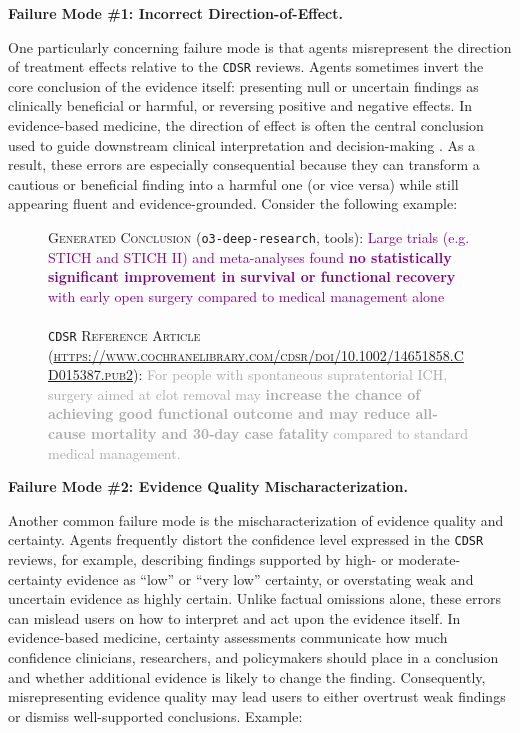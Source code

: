 \documentclass{article}
\newcommand{\xhdr}[1]{%
  \noindent\textbf{#1.}
}
\begin{document}
\xhdr{Failure Mode \#1: Incorrect Direction-of-Effect} 
One particularly concerning failure mode is that agents misrepresent the direction of treatment effects relative to the \texttt{CDSR} reviews. Agents sometimes invert the core conclusion of the evidence itself: presenting null or uncertain findings as clinically beneficial or harmful, or reversing positive and negative effects. In evidence-based medicine, the direction of effect is often the central conclusion used to guide downstream clinical interpretation and decision-making \cite{oxman2022key}. As a result, these errors are especially consequential because they can transform a cautious or beneficial finding into a harmful one (or vice versa) while still appearing fluent and evidence-grounded. Consider the following example:

\begin{figure}[h!]
\centering
\begin{small}
\begin{tcolorbox}[colback=gray!5, colframe=red, width=\textwidth]
\textsc{Generated Conclusion} (\texttt{o3-deep-research}, tools): \textcolor{purple}{Large trials (e.g. STICH and STICH II) and meta-analyses found \textbf{no statistically significant improvement in survival or functional recovery} with early open surgery compared to medical management alone}\\\\
\texttt{CDSR} \textsc{Reference Article (\url{https://www.cochranelibrary.com/cdsr/doi/10.1002/14651858.CD015387.pub2}):} \textcolor{darkgray}{For people with spontaneous supratentorial ICH, surgery aimed at clot removal may \textbf{increase the chance of achieving good functional outcome and may reduce all‐cause mortality and 30‐day case fatality} compared to standard medical management.} 
\end{tcolorbox}
\end{small}
\end{figure}

\xhdr{Failure Mode \#2: Evidence Quality Mischaracterization}
Another common failure mode is the mischaracterization of evidence quality and certainty. Agents frequently distort the confidence level expressed in the \texttt{CDSR} reviews, for example, describing findings supported by high- or moderate-certainty evidence as ``low'' or ``very low'' certainty, or overstating weak and uncertain evidence as highly certain. Unlike factual omissions alone, these errors can mislead users on how to interpret and act upon the evidence itself. In evidence-based medicine, certainty assessments communicate how much confidence clinicians, researchers, and policymakers should place in a conclusion and whether additional evidence is likely to change the finding. Consequently, misrepresenting evidence quality may lead users to either overtrust weak findings or dismiss well-supported conclusions. Example:
\end{document}
